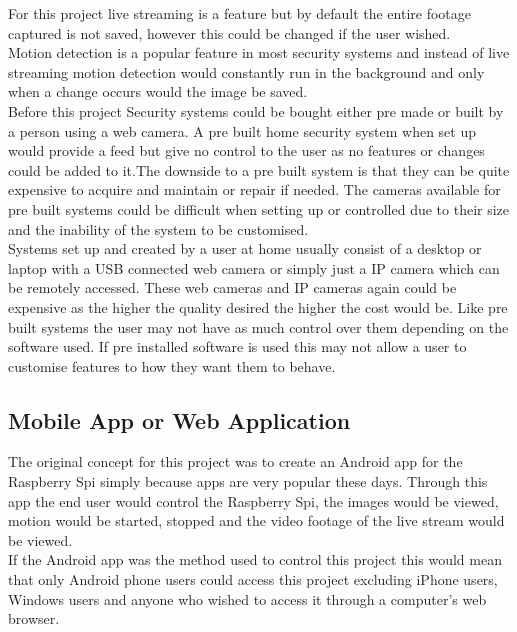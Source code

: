\documentclass[12pt]{report}
\begin{document}
For this project live streaming is a feature but by default the entire footage captured is not saved, however this could be changed if the user wished.\\

Motion detection is a popular feature in most security systems and instead of live streaming motion detection would constantly run in the background and only when a change occurs would the image be saved. \\

Before this project Security systems could be bought either pre made or built by a person using a web camera. A pre built home security system when set up would provide a feed but give no control to the user as no features or changes could be added to it.The downside to a pre built system is that they can be quite expensive to acquire and maintain or repair if needed. The cameras available for pre built systems could be difficult when setting up or controlled due to their size and the inability of the system to be customised.\\

Systems set up and created by a user at home usually consist of a desktop or laptop with a USB connected web camera or simply just a IP camera which can be remotely accessed. These web cameras and IP cameras again could be expensive as the higher the quality desired the higher the cost would be. Like pre built systems the user may not have as much control over them depending on the software used. If pre installed software is used this may not allow a user to customise features to how they want them to behave.\\ 

\subsection{Mobile App or Web Application}
\label{subsec:Android}
The original concept for this project was to create an Android app for the Raspberry Spi simply because apps are very popular these days. Through this app the end user would control the Raspberry Spi, the images would be viewed, motion would be started, stopped and the video footage of the live stream would be viewed.\\

If the Android app was the method used to control this project this would mean that only Android phone users could access this project excluding iPhone users, Windows users and anyone who wished to access it through a computer's web browser.\\
\end{document}
